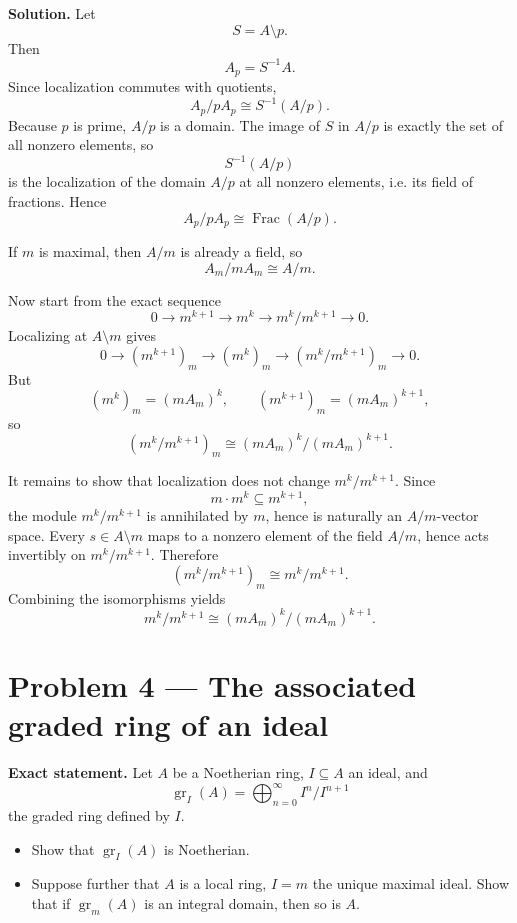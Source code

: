 \documentclass[12pt,a4paper]{article}
\theoremstyle{plain}
\theoremstyle{definition}      %
\begin{document}
	\textbf{Solution.}
	Let
	\[
	S=A\setminus p.
	\]
	Then
	\[
	A_p=S^{-1}A.
	\]
	Since localization commutes with quotients,
	\[
	A_p/pA_p \cong S^{-1}(A/p).
	\]
	Because \(p\) is prime, \(A/p\) is a domain. The image of \(S\) in \(A/p\) is exactly the set of all nonzero elements, so
	\[
	S^{-1}(A/p)
	\]
	is the localization of the domain \(A/p\) at all nonzero elements, i.e. its field of fractions. Hence
	\[
	A_p/pA_p \cong \operatorname{Frac}(A/p).
	\]
	
	If \(m\) is maximal, then \(A/m\) is already a field, so
	\[
	A_m/mA_m\cong A/m.
	\]
	
	Now start from the exact sequence
	\[
	0\longrightarrow m^{k+1}\longrightarrow m^k\longrightarrow m^k/m^{k+1}\longrightarrow 0.
	\]
	Localizing at \(A\setminus m\) gives
	\[
	0\longrightarrow (m^{k+1})_m\longrightarrow (m^k)_m\longrightarrow (m^k/m^{k+1})_m\longrightarrow 0.
	\]
	But
	\[
	(m^k)_m=(mA_m)^k,\qquad (m^{k+1})_m=(mA_m)^{k+1},
	\]
	so
	\[
	(m^k/m^{k+1})_m \cong (mA_m)^k/(mA_m)^{k+1}.
	\]
	
	It remains to show that localization does not change \(m^k/m^{k+1}\). Since
	\[
	m\cdot m^k\subseteq m^{k+1},
	\]
	the module \(m^k/m^{k+1}\) is annihilated by \(m\), hence is naturally an \(A/m\)-vector space. Every \(s\in A\setminus m\) maps to a nonzero element of the field \(A/m\), hence acts invertibly on \(m^k/m^{k+1}\). Therefore
	\[
	(m^k/m^{k+1})_m\cong m^k/m^{k+1}.
	\]
	Combining the isomorphisms yields
	\[
	m^k/m^{k+1}\cong (mA_m)^k/(mA_m)^{k+1}.
	\]
	
	\bigskip
	
	\section*{Problem 4 --- The associated graded ring of an ideal}
	
	\textbf{Exact statement.}
	Let \(A\) be a Noetherian ring, \(I\subseteq A\) an ideal, and
	\[
	\operatorname{gr}_I(A)=\bigoplus_{n=0}^{\infty} I^n/I^{n+1}
	\]
	the graded ring defined by \(I\).
	
	\begin{itemize}
		\item[(a)] Show that \(\operatorname{gr}_I(A)\) is Noetherian.
		\item[(b)] Suppose further that \(A\) is a local ring, \(I=m\) the unique maximal ideal. Show that if \(\operatorname{gr}_m(A)\) is an integral domain, then so is \(A\).
	\end{itemize}
	
\end{document}
